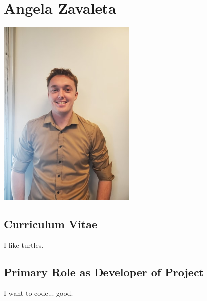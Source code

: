 \section[Angela]{Angela Zavaleta}

\includegraphics[width=0.5\textwidth]{pic/joe}

\subsection[CV]{Curriculum Vitae}

I like turtles.

\subsection[Role]{Primary Role as Developer of Project}

I want to code... good.

\newpage
